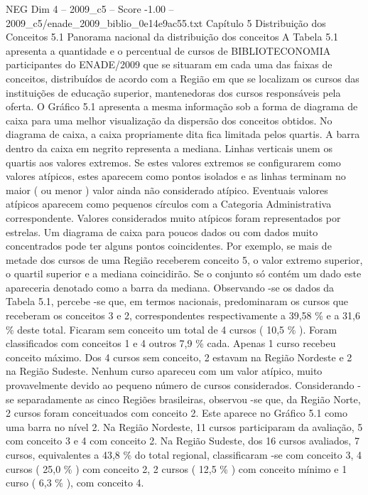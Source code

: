 \begin{textsample}{NEG Dim 4 – 2009\_c5 – Score -1.00 – 2009\_c5/enade\_2009\_biblio\_0e14e9ac55.txt}  \label{ex:f4_neg_089}
Capítulo 5 Distribuição dos Conceitos 5.1 Panorama nacional da distribuição dos conceitos A Tabela 5.1 apresenta a quantidade e o percentual de cursos de BIBLIOTECONOMIA participantes do ENADE/2009 que se situaram em cada uma das faixas de conceitos, distribuídos de acordo com a Região em que se localizam os cursos das instituições de educação superior, mantenedoras dos cursos responsáveis pela oferta.
O Gráfico 5.1 apresenta a mesma informação sob a forma de diagrama de caixa para uma melhor visualização da dispersão dos conceitos obtidos.
No diagrama de caixa, a caixa propriamente dita fica limitada pelos quartis.
A barra dentro da caixa em negrito representa a mediana.
Linhas verticais unem os quartis aos valores extremos.
Se estes valores extremos se configurarem como valores atípicos, estes aparecem como pontos isolados e as linhas terminam no maior ( ou menor ) valor ainda não considerado atípico.
Eventuais valores atípicos aparecem como pequenos círculos com a Categoria Administrativa correspondente.
Valores considerados muito atípicos foram representados por estrelas.
Um diagrama de caixa para poucos dados ou com dados muito concentrados pode ter alguns pontos coincidentes.
Por exemplo, se mais de metade dos cursos de uma Região receberem conceito 5, o valor extremo superior, o quartil superior e a mediana coincidirão.
Se o conjunto só contém um dado este apareceria denotado como a barra da mediana.
Observando -se os dados da Tabela 5.1, percebe -se que, em termos nacionais, predominaram os cursos que receberam os conceitos 3 e 2, correspondentes respectivamente a 39,58 \% e a 31,6 \% deste total.
Ficaram sem conceito um total de 4 cursos ( 10,5 \% ).
Foram classificados com conceitos 1 e 4 outros 7,9 \% cada.
Apenas 1 curso recebeu conceito máximo.
Dos 4 cursos sem conceito, 2 estavam na Região Nordeste e 2 na Região Sudeste.
Nenhum curso apareceu com um valor atípico, muito provavelmente devido ao pequeno número de cursos considerados.
Considerando -se separadamente as cinco Regiões brasileiras, observou -se que, da Região Norte, 2 cursos foram conceituados com conceito 2.
Este aparece no Gráfico 5.1 como uma barra no nível 2.
Na Região Nordeste, 11 cursos participaram da avaliação, 5 com conceito 3 e 4 com conceito 2.
Na Região Sudeste, dos 16 cursos avaliados, 7 cursos, equivalentes a 43,8 \% do total regional, classificaram -se com conceito 3, 4 cursos ( 25,0 \% ) com conceito 2, 2 cursos ( 12,5 \% ) com conceito mínimo e 1 curso ( 6,3 \% ), com conceito 4.

\end{textsample}
